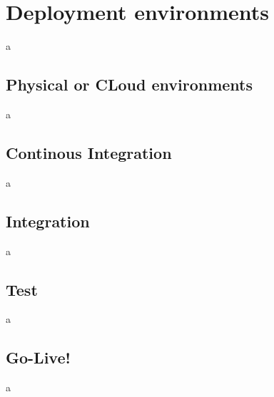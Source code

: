 \chapter{Deployment environments}

a

\section{Physical or CLoud environments}

a

\section{Continous Integration}

a

\section{Integration}

a

\section{Test}

a

\section{Go-Live!}

a